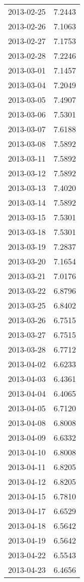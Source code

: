 \begin{tabular}{lr}
2013-02-25 &      7.2443 \\
2013-02-26 &      7.1063 \\
2013-02-27 &      7.1753 \\
2013-02-28 &      7.2246 \\
2013-03-01 &      7.1457 \\
2013-03-04 &      7.2049 \\
2013-03-05 &      7.4907 \\
2013-03-06 &      7.5301 \\
2013-03-07 &      7.6188 \\
2013-03-08 &      7.5892 \\
2013-03-11 &      7.5892 \\
2013-03-12 &      7.5892 \\
2013-03-13 &      7.4020 \\
2013-03-14 &      7.5892 \\
2013-03-15 &      7.5301 \\
2013-03-18 &      7.5301 \\
2013-03-19 &      7.2837 \\
2013-03-20 &      7.1654 \\
2013-03-21 &      7.0176 \\
2013-03-22 &      6.8796 \\
2013-03-25 &      6.8402 \\
2013-03-26 &      6.7515 \\
2013-03-27 &      6.7515 \\
2013-03-28 &      6.7712 \\
2013-04-02 &      6.6233 \\
2013-04-03 &      6.4361 \\
2013-04-04 &      6.4065 \\
2013-04-05 &      6.7120 \\
2013-04-08 &      6.8008 \\
2013-04-09 &      6.6332 \\
2013-04-10 &      6.8008 \\
2013-04-11 &      6.8205 \\
2013-04-12 &      6.8205 \\
2013-04-15 &      6.7810 \\
2013-04-17 &      6.6529 \\
2013-04-18 &      6.5642 \\
2013-04-19 &      6.5642 \\
2013-04-22 &      6.5543 \\
2013-04-23 &      6.4656 \\

\end{tabular}

